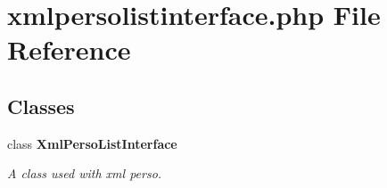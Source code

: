 \section{xmlpersolistinterface.php File Reference}
\label{xmlpersolistinterface_8php}


\subsection*{Classes}
\begin{CompactItemize}
\item 
class {\bf Xml\-Perso\-List\-Interface}
\begin{CompactList}\small\item\em A class used with xml perso. \item\end{CompactList}\end{CompactItemize}
